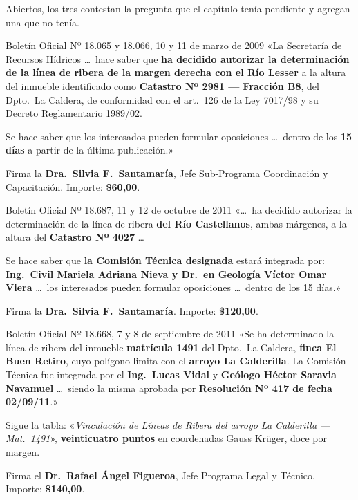 Abiertos, los tres contestan la pregunta que el capítulo tenía pendiente y agregan una que no
tenía.

\begin{ficha}{Boletín Oficial Nº 18.065 y 18.066, 10 y 11 de marzo de 2009}
«La Secretaría de Recursos Hídricos \ldots\ hace saber que \textbf{ha decidido autorizar la
determinación de la línea de ribera de la margen derecha con el Río Lesser} a la altura del
inmueble identificado como \textbf{Catastro Nº 2981 --- Fracción B8}, del Dpto.\ La Caldera, de
conformidad con el art.\ 126 de la Ley 7017/98 y su Decreto Reglamentario 1989/02.

Se hace saber que los interesados pueden formular oposiciones \ldots\ dentro de los
\textbf{15 días} a partir de la última publicación.»

Firma la \textbf{Dra.\ Silvia F.\ Santamaría}, Jefe Sub-Programa Coordinación y Capacitación.
Importe: \textbf{\$60,00}.
\end{ficha}

\begin{ficha}{Boletín Oficial Nº 18.687, 11 y 12 de octubre de 2011}
«\ldots\ ha decidido autorizar la determinación de la línea de ribera \textbf{del Río
Castellanos}, ambas márgenes, a la altura del \textbf{Catastro Nº 4027} \ldots

Se hace saber que \textbf{la Comisión Técnica designada} estará integrada por: \textbf{Ing.\
Civil Mariela Adriana Nieva y Dr.\ en Geología Víctor Omar Viera} \ldots\ los interesados pueden
formular oposiciones \ldots\ dentro de los 15 días.»

Firma la \textbf{Dra.\ Silvia F.\ Santamaría}. Importe: \textbf{\$120,00}.
\end{ficha}

\begin{ficha}{Boletín Oficial Nº 18.668, 7 y 8 de septiembre de 2011}
«Se ha determinado la línea de ribera del inmueble \textbf{matrícula 1491} del Dpto.\ La
Caldera, \textbf{finca El Buen Retiro}, cuyo polígono limita con el \textbf{arroyo La
Calderilla}. La Comisión Técnica fue integrada por el \textbf{Ing.\ Lucas Vidal} y
\textbf{Geólogo Héctor Saravia Navamuel} \ldots\ siendo la misma aprobada por \textbf{Resolución
Nº 417 de fecha 02/09/11}.»

Sigue la tabla: «\textit{Vinculación de Líneas de Ribera del arroyo La Calderilla --- Mat.\
1491}», \textbf{veinticuatro puntos} en coordenadas Gauss Krüger, doce por margen.

Firma el \textbf{Dr.\ Rafael Ángel Figueroa}\index{Figueroa, Rafael Ángel}, Jefe Programa Legal
y Técnico. Importe: \textbf{\$140,00}.
\end{ficha}

